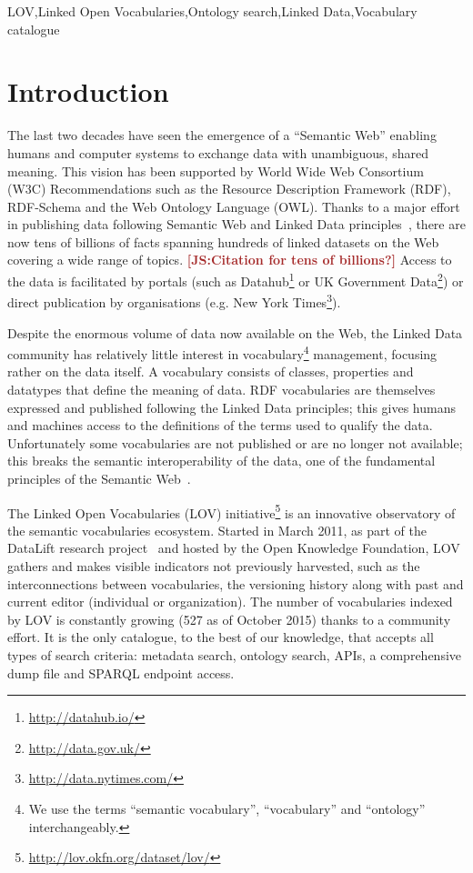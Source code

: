 \documentclass{iosart2c}
\newcommand{\js}[1]{\textcolor{brown}{\textbf{[JS:#1]}}}
\begin{document}
\begin{frontmatter}
\begin{abstract}
\end{abstract}

\begin{keyword}
LOV\sep Linked Open Vocabularies\sep Ontology search\sep Linked Data\sep Vocabulary catalogue
\end{keyword}

\end{frontmatter}


\section{Introduction}
The last two decades have seen the emergence of a ``Semantic Web'' enabling humans and computer systems to exchange data with unambiguous, shared meaning. This vision has been supported by World Wide Web Consortium (W3C) Recommendations such as the Resource Description Framework (RDF), RDF-Schema and the Web Ontology Language (OWL). Thanks to a major effort in publishing data following Semantic Web and Linked Data principles~\cite{timld}, there are now tens of billions of facts spanning hundreds of linked datasets on the Web covering a wide range of topics. \js{Citation for tens of billions?} 
Access to the data is facilitated by portals (such as Datahub\footnote{\url{http://datahub.io/}} or UK Government Data\footnote{\url{http://data.gov.uk/}}) or direct publication by organisations (e.g. New York Times\footnote{\url{http://data.nytimes.com/}}). 

Despite the enormous volume of data now available on the Web, the Linked Data community has relatively little interest in vocabulary\footnote{We use the terms ``semantic vocabulary'', ``vocabulary'' and ``ontology'' interchangeably.} management, focusing rather on the data itself. A vocabulary consists of classes, properties and datatypes that define the meaning of data. RDF vocabularies are themselves expressed and published following the Linked Data principles; this gives humans and machines access to the definitions of the terms used to qualify the data. Unfortunately some vocabularies are not published or are no longer not available; this breaks the semantic interoperability of the data, one of the fundamental principles of the Semantic Web~\cite{janowicz2014five}.

The Linked Open Vocabularies (LOV) initiative\footnote{\url{http://lov.okfn.org/dataset/lov/}} is an innovative observatory of the semantic vocabularies ecosystem. Started in March 2011, as part of the DataLift research project~\cite{scharffe_2012} and hosted by the Open Knowledge Foundation, LOV gathers and makes visible  indicators not previously harvested, such as the interconnections between vocabularies, the versioning history along with past and current editor  (individual or organization). The number of vocabularies indexed by LOV is constantly growing (527 as of October 2015) thanks to a community effort. It is the only catalogue, to the best of our knowledge, that accepts all types of search criteria: metadata search, ontology search, APIs, a comprehensive dump file and SPARQL endpoint access. 
\end{document}
